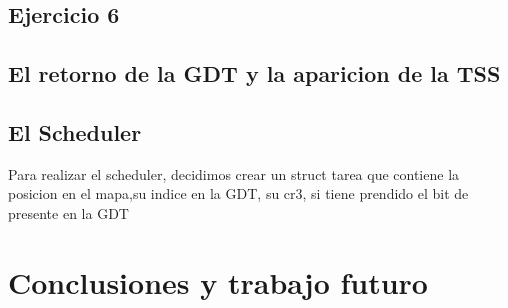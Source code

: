 \documentclass[a4paper]{article}
\newenvironment{codesnippet}{%
	\begin{Sbox}\begin{minipage}{\textwidth}\sffamily\small}%
	{\end{minipage}\end{Sbox}%
		\begin{center}%
		\vspace{-0.4cm}\colorbox{litegrey}{\TheSbox}\end{center}\vspace{0.3cm}}
\begin{document}

\subsection{Ejercicio 6}




\subsection{El retorno de la GDT y la aparicion de la TSS}

\subsection{El Scheduler}
Para realizar el scheduler, decidimos crear un struct tarea que contiene la posicion en el mapa,su indice en la GDT, su cr3, si tiene prendido el bit de presente en la GDT

\section{Conclusiones y trabajo futuro}






\end{document}
